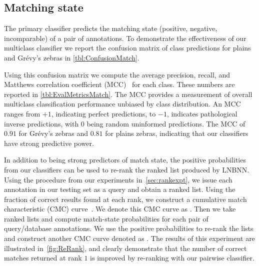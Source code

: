     \FloatBarrier{}
    \subsection{Matching state}

        The primary classifier predicts the matching state (positive, negative, incomparable) of a pair of
        annotations. To demonstrate the effectiveness of our multiclass classifier we report the confusion matrix
        of class predictions for plains and Grévy's zebras in \cref{tbl:ConfusionMatch}.

        Using this confusion matrix we compute the average precision, recall, and Matthews correlation
          coefficient (MCC)~\cite{powers_evaluation_2011} for each class.
        These numbers are reported in \cref{tbl:EvalMetricsMatch}.
        The MCC provides a measurement of overall multiclass classification performance unbiased by class
          distribution.
        An MCC ranges from $+1$, indicating perfect predictions, to $-1$, indicates pathological inverse
          predictions, with $0$ being random uninformed predictions.
        The MCC of $0.91$ for Grévy's zebras and $0.81$ for plains zebras, indicating that our classifiers have
          strong predictive power.

        \ConfusionMatch{}

        \EvalMetricsMatch{}

        In addition to being strong predictors of match state, the positive probabilities from our classifiers
          can be used to re-rank the ranked list produced by LNBNN.
        Using the procedure from our experiments in~\cref{sec:rankexpt}, we issue each annotation in our testing
          set as a query and obtain a ranked list.
        Using the fraction of correct results found at each rank, we construct a cumulative match characteristic
          (CMC) curve~\cite{decann_relating_2013}.
        We denote this CMC curve as .
        Then we take ranked lists and compute match-state probabilities for each pair of query/database
          annotations.
        We use the positive probabilities to re-rank the lists and construct another CMC curve denoted as
          .
        The results of this experiment are illustrated in~\cref{fig:ReRank}, and clearly demonstrate that the
          number of correct matches returned at rank $1$ is improved by re-ranking with our pairwise classifier.

        \ReRank{}
        
